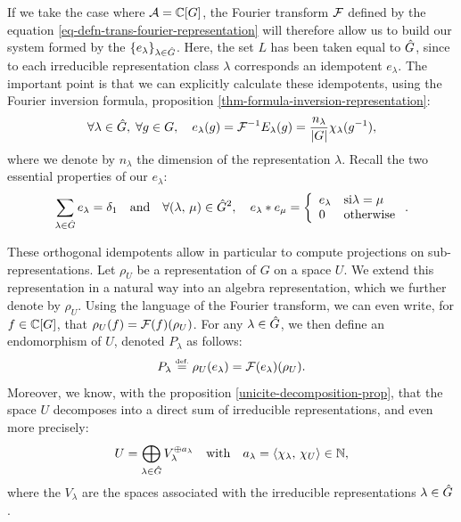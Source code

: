  
If we take the case where $ \mathcal{A} = \mathbb{C} [G] $, the Fourier transform $ \mathcal{F} $ defined by the equation \eqref{eq-defn-trans-fourier-representation} will therefore allow us to build our system formed by the $ \{e_{\lambda}\}_{\lambda \in \hat{G}} $. Here, the set $ L $ has been taken equal to $ \hat{G} $, since to each irreducible representation class $ \lambda $ corresponds an idempotent $ e_{\lambda} $. The important point is that we can explicitly calculate these idempotents, using the Fourier inversion formula, proposition \ref{thm-formula-inversion-representation}:
\begin{equation*}
\forall \lambda \in \hat{G}, \; \forall g \in G, \quad e_{\lambda} (g) = \mathcal{F}^{-1} E_{\lambda} (g) = \frac{n_{\lambda}}{|G| } \chi_{\lambda} (g^{-1}),
\end{equation*}
where we denote by $ n_{\lambda} $ the dimension of the representation $ \lambda $. Recall the two essential properties of our $ e_{\lambda} $:
\begin{equation*}
\sum_{\lambda \in \hat{G}}{e_{\lambda}} = \delta_1 \quad \text{and} \quad \forall (\lambda, \, \mu) \in \hat{G}^2, \quad e_{\lambda} * e_{\mu} = \left\{\begin{array}{ll} e_{\lambda} & \text{si} \lambda = \mu \\0 & \text{otherwise} \end{array} \right. .
\end{equation*}
 
 
 
 These orthogonal idempotents allow in particular to compute projections on sub-representations. Let $ \rho_U $ be a representation of $G$ on a space $ U $. We extend this representation in a natural way into an algebra representation, which we further denote by $ \rho_U $. Using the language of the Fourier transform, we can even write, for $ f \in \mathbb{C} [G] $, that $ \rho_U (f) = \mathcal{F}(f) (\rho_U) $. For any $ \lambda \in \hat{G} $, we then define an endomorphism of $ U $, denoted $ P_{\lambda} $ as follows:
\begin{equation*}
P_{\lambda} \stackrel{\mbox{\upshape\tiny def.}}{=} \rho_U (e_\lambda) = \mathcal{F}(e_{\lambda}) (\rho_U).
\end{equation*}
Moreover, we know, with the proposition \ref{unicite-decomposition-prop}, that the space $ U $ decomposes into a direct sum of irreducible representations, and even more precisely:
\begin{equation*}
U = \bigoplus_{\lambda \in \hat{G}}{V_{\lambda}^{\oplus a_{\lambda}}} \quad \text{with} \quad a_\lambda = \langle \chi_{\lambda},\,\chi_U\rangle \in \mathbb{N},
\end{equation*}
where the $ V_{\lambda} $ are the spaces associated with the irreducible representations $ \lambda \in \hat{G} $.
 
